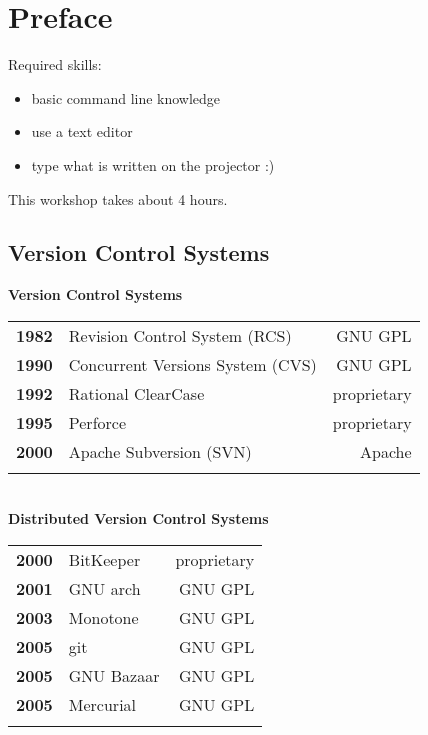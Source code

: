 \section{Preface}
\begin{frame}
  \slidetitle

  Required skills:
  \begin{itemize}
    \item basic command line knowledge
    \item use a text editor
    \item type what is written on the projector :)
  \end{itemize}
  \vspace{1em}
  This workshop takes about 4 hours.
\end{frame}

\subsection{Version Control Systems}
\begin{frame}
  \subslidetitle

  \textbf{Version Control Systems}
  \pause
  \\
  \begin{tabular}{lp{5cm}r}
    \textbf{1982} & Revision Control System (RCS) & GNU GPL \\
    \pause
    \textbf{1990} & Concurrent Versions System (CVS) & GNU GPL \\
    \pause
    \textbf{1992} & Rational ClearCase & proprietary \\
    \pause
    \textbf{1995} & Perforce  & proprietary \\
    \pause
    \textbf{2000} & Apache Subversion (SVN)  & Apache \\
    \pause
  \end{tabular}
  \\
  \textbf{Distributed Version Control Systems}
  \pause
  \\
  \begin{tabular}{lp{5cm}r}
    \textbf{2000} & BitKeeper  & proprietary \\
    \pause
    \textbf{2001} & GNU arch   & GNU GPL \\
    \pause
    \textbf{2003} & Monotone   & GNU GPL \\
    \pause
    \textbf{2005} & git & GNU GPL \\
    \pause
    \textbf{2005} & GNU Bazaar & GNU GPL \\
    \pause
    \textbf{2005} & Mercurial  & GNU GPL \\
    \pause
  \end{tabular}

\end{frame}


